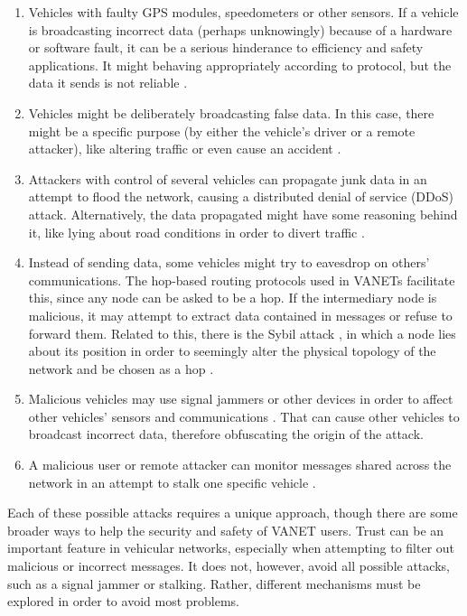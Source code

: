 \begin{enumerate}
	\item 	Vehicles with faulty GPS modules, speedometers or other sensors.
			If a vehicle is broadcasting incorrect data (perhaps unknowingly) because of a hardware or software fault, it can be a serious hinderance to efficiency and safety applications.
			It might behaving appropriately according to protocol, but the data it sends is not reliable \citep{isaac2010security}.
	\item	Vehicles might be deliberately broadcasting false data.
			In this case, there might be a specific purpose (by either the vehicle's driver or a remote attacker), like altering traffic or even cause an accident \citep{golle2004detecting}.
	\item   Attackers with control of several vehicles can propagate junk data in an attempt to flood the network, causing a distributed denial of service (DDoS) attack.
			Alternatively, the data propagated might have some reasoning behind it, like lying about road conditions in order to divert traffic \citep{garip2015congestion}.
	\item	Instead of sending data, some vehicles might try to eavesdrop on others' communications.
			The hop-based routing protocols used in VANETs facilitate this, since any node can be asked to be a hop.
			If the intermediary node is malicious, it may attempt to extract data contained in messages or refuse to forward them.
			Related to this, there is the Sybil attack \citep{isaac2010security}, in which a node lies about its position in order to seemingly alter the physical topology of the network and be chosen as a hop \citep{leinmuller2005influence}.
	\item	Malicious vehicles may use signal jammers or other devices in order to affect other vehicles' sensors and communications \citep{isaac2010security}.
			That can cause other vehicles to broadcast incorrect data, therefore obfuscating the origin of the attack.
	\item	A malicious user or remote attacker can monitor messages shared across the network in an attempt to stalk one specific vehicle \citep{isaac2010security}.
	
\end{enumerate}

Each of these possible attacks requires a unique approach, though there are some broader ways to help the security and safety of VANET users.
Trust can be an important feature in vehicular networks, especially when attempting to filter out malicious or incorrect messages.
It does not, however, avoid all possible attacks, such as a signal jammer or stalking.
Rather, different mechanisms must be explored in order to avoid most problems.

